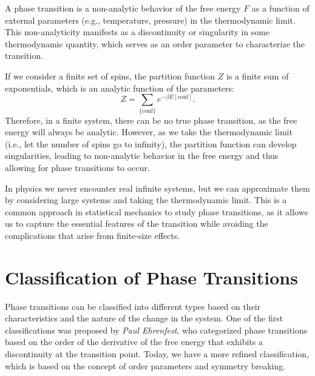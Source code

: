 \begin{definition}
    A phase transition is a non-analytic behavior of the free energy $F$ as a function of external parameters (e.g., temperature, pressure) in the thermodynamic limit. This non-analyticity manifests as a discontinuity or singularity in some thermodynamic quantity, which serves as an order parameter to characterize the transition.
\end{definition}

\begin{example}
    If we consider a finite set of spins, the partition function $Z$ is a finite sum of exponentials, which is an analytic function of the parameters:
    \[
        Z = \sum_{\{\text{conf}\}} e^{- \beta E[\text{conf}]}.
    \]
    Therefore, in a finite system, there can be no true phase transition, as the free energy will always be analytic. However, as we take the thermodynamic limit (i.e., let the number of spins go to infinity), the partition function can develop singularities, leading to non-analytic behavior in the free energy and thus allowing for phase transitions to occur.
\end{example}

In physics we never encounter real infinite systems, but we can approximate them by considering large systems and taking the thermodynamic limit. This is a common approach in statistical mechanics to study phase transitions, as it allows us to capture the essential features of the transition while avoiding the complications that arise from finite-size effects.

\section{Classification of Phase Transitions}

Phase transitions can be classified into different types based on their characteristics and the nature of the change in the system. One of the first classifications was proposed by \textit{Paul Ehrenfest}, who categorized phase transitions based on the order of the derivative of the free energy that exhibits a discontinuity at the transition point. Today, we have a more refined classification, which is based on the concept of order parameters and symmetry breaking.

